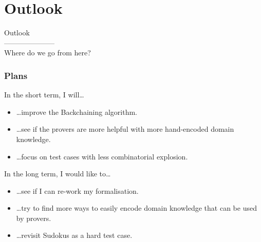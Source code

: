 \documentclass[aspectratio=169, usenames, dvipsnames]{beamer}
\begin{document}
\section{Outlook}

\begin{frame}
\Huge
\begin{center}
Outlook\large\\
---------------------\\
Where do we go from here?
\end{center}
\end{frame}

\begin{frame}
\frametitle{Plans}
In the short term, I will\dots
\medskip

\begin{itemize}
\item\dots improve the Backchaining algorithm.
\item\dots see if the provers are more helpful with more hand-encoded domain knowledge.
\item\dots focus on test cases with less combinatorial explosion.
\end{itemize}
\pause\bigskip

In the long term, I would like to\dots
\medskip

\begin{itemize}
\item\dots see if I can re-work my formalisation.
\item\dots try to find more ways to easily encode domain knowledge that can be used by provers.
\item\dots revisit Sudokus as a hard test case.
\end{itemize}
\end{frame}
\end{document}
